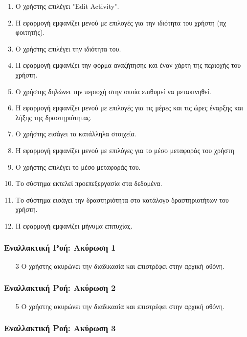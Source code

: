 \begin{enumerate}
    \item Ο χρήστης επιλέγει "Edit Activity".
    \item Η εφαρμογή εμφανίζει μενού με επιλογές για την ιδιότητα του χρήστη (πχ φοιτητής).
    \item Ο χρήστης επιλέγει την ιδιότητα του.
    \item Η εφαρμογή εμφανίζει την φόρμα αναζήτησης και έναν χάρτη της περιοχής του χρήστη.
    \item Ο χρήστης δηλώνει την περιοχή στην οποία επιθυμεί να μετακινηθεί.
    \item Η εφαρμογή εμφανίζει μενού με επιλογές για τις μέρες και τις ώρες έναρξης και λήξης
          της δραστηριότητας.
    \item Ο χρήστης εισάγει τα κατάλληλα στοιχεία.
    \item H εφαρμογή εμφανίζει μενού με επιλόγες για το μέσο μεταφοράς του χρήστη
    \item Ο χρήστης επιλέγει το μέσο μεταφοράς του.
    \item Το σύστημα εκτελεί προεπεξεργασία στα δεδομένα.
    \item Το σύστημα εισάγει την δραστηριότητα στο κατάλογο δραστηριοτήτων του χρήστη.
    \item Η εφαρμογή εμφανίζει μήνυμα επιτυχίας.
\end{enumerate}

\subsubsection{Εναλλακτική Ροή: Ακύρωση 1}

\begin{enumerate}
    \item[3] Ο χρήστης ακυρώνει την διαδικασία και επιστρέφει στην αρχική οθόνη.
\end{enumerate}

\subsubsection{Εναλλακτική Ροή: Ακύρωση 2}

\begin{enumerate}
    \item[5] Ο χρήστης ακυρώνει την διαδικασία και επιστρέφει στην αρχική οθόνη.
\end{enumerate}

\subsubsection{Εναλλακτική Ροή: Ακύρωση 3}

